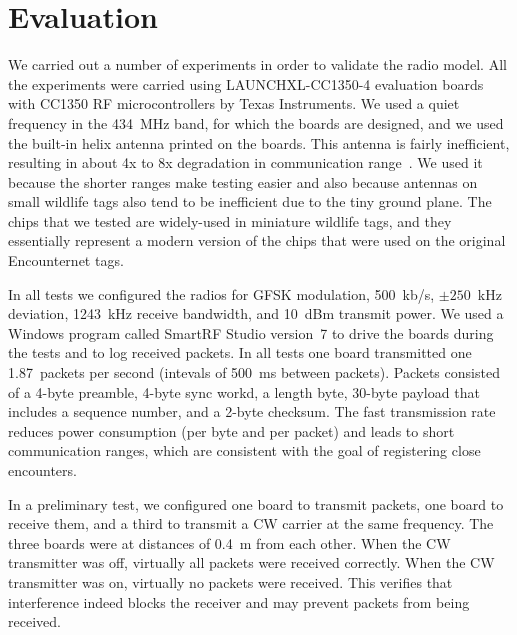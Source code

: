 \section{Evaluation}
\label{sectionsimulation}

We carried out a number of experiments in order to validate the radio model. 
All the experiments were carried using LAUNCHXL-CC1350-4 evaluation boards with CC1350 RF microcontrollers 
by Texas Instruments. We used a quiet frequency in the 434~MHz band, for which the boards are designed,
and we used the built-in helix antenna printed on the boards. This antenna is fairly inefficient, resulting
in about 4x to 8x degradation in communication range~\cite{LAUNCHXL-CC1350-4}. We used it because the shorter 
ranges make testing easier
and also because antennas on small wildlife tags also tend to be inefficient due to the tiny ground plane.
The chips that we tested are widely-used in miniature wildlife tags, and they essentially represent a modern
version of the chips that were used on the original Encounternet tags.

In all tests we configured the radios for GFSK modulation, 500~kb/s, $\pm 250$~kHz deviation, 1243~kHz receive bandwidth,
and 10~dBm transmit power. We used a Windows program called SmartRF Studio version~7 to drive the boards during
the tests and to log received packets. In all tests one board transmitted one 1.87~packets per second (intevals of
500~ms between packets). Packets consisted of a 4-byte preamble, 4-byte sync workd, a length byte, 30-byte payload 
that includes a sequence number, and a 2-byte checksum. The fast transmission rate reduces power consumption (per byte and
per packet) and leads to short communication ranges, which are consistent with the goal of registering close encounters.

In a preliminary test, we configured one board to transmit packets, one board to receive them, and a third to transmit a 
CW carrier at the same frequency. The three boards were at distances of 0.4~m from each other. When the CW transmitter
was off, virtually all packets were received correctly. When the CW transmitter was on, virtually no packets were received.
This verifies that interference indeed blocks the receiver and may prevent packets from being received.

